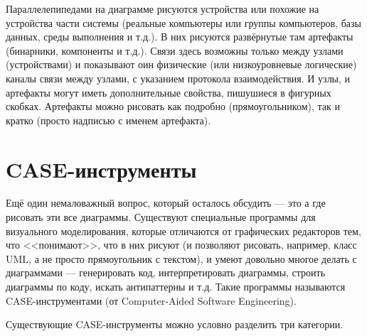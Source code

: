 \documentclass[a5paper]{article}
\begin{document}
Параллелепипедами на диаграмме рисуются устройства или похожие на устройства части системы (реальные компьютеры или группы компьютеров, базы данных, среды выполнения и т.д.). В них рисуются развёрнутые там артефакты (бинарники, компоненты и т.д.). Связи здесь возможны только между узлами (устройствами) и показывают оин физические (или низкоуровневые логические) каналы связи между узлами, с указанием протокола взаимодействия. И узлы, и артефакты могут иметь дополнительные свойства, пишушиеся в фигурных скобках. Артефакты можно рисовать как подробно (прямоугольником), так и кратко (просто надписью с именем артефакта).

\section{CASE-инструменты}

Ещё один немаловажный вопрос, который осталось обсудить --- это а где рисовать эти все диаграммы. Существуют специальные программы для визуального моделирования, которые отличаются от графических редакторов тем, что <<понимают>>, что в них рисуют (и позволяют рисовать, например, класс UML, а не просто прямоугольник с текстом), и умеют довольно многое делать с диаграммами --- генерировать код, интерпретировать диаграммы, строить диаграммы по коду, искать антипаттерны и т.д. Такие программы называются CASE-инструментами (от Computer-Aided Software Engineering).

Существующие CASE-инструменты можно условно разделить три категории.
\end{document}
